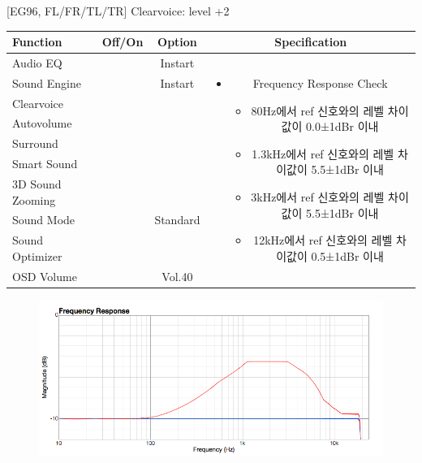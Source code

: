 \documentclass{beamer}
\begin{document}
\begin{frame}[t]{[EG96, FL/FR/TL/TR] Clearvoice: level +2}
\begin{tiny}
\begin{tabular}{@{}lccc@{}}
\toprule
Function & Off/On & Option & Specification \\
\midrule
Audio EQ & \color{black}{Off} & Instart &
\multirow{10}{60mm}{
\begin{itemize}
\item Frequency Response Check
	\begin{itemize}
	\item 80Hz에서 ref 신호와의 레벨 차이값이 0.0±1dBr 이내
	\item 1.3kHz에서 ref 신호와의 레벨 차이값이 5.5±1dBr 이내
	\item 3kHz에서 ref 신호와의 레벨 차이값이 5.5±1dBr 이내
	\item 12kHz에서 ref 신호와의 레벨 차이값이 0.5±1dBr 이내
	\end{itemize}
\end{itemize}
} \\
Sound Engine & \color{blue}{On} & Instart & \\
Clearvoice & \color{blue}{On} & \color{blue}{+2} & \\
Autovolume & \color{black}{Off} & & \\
Surround & \color{black}{Off} & & \\
Smart Sound & \color{black}{Off} & & \\
3D Sound Zooming & \color{black}{Off} & & \\
Sound Mode & \color{blue}{On} & Standard & \\
Sound Optimizer & \color{black}{Off} & & \\
OSD Volume & \color{blue}{On} & Vol.40 & \\
\midrule
\end{tabular}
\end{tiny}

\begin{figure}[b]
\includegraphics[height=0.4\textwidth]{figure/EG96/cv2.png}
\end{figure}

\end{frame}
\end{document}
